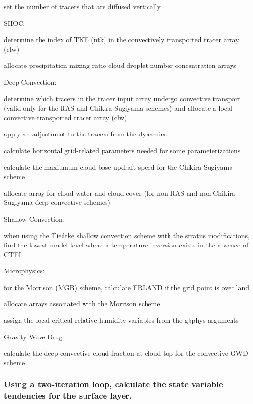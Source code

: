 \begin{DoxyItemize}
\begin{DoxyItemize}
\item set the number of tracers that are diffused vertically
\end{DoxyItemize}
\item S\+H\+OC\+:
\begin{DoxyItemize}
\item determine the index of T\+KE (ntk) in the convectively transported tracer array (clw)
\item allocate precipitation mixing ratio cloud droplet number concentration arrays
\end{DoxyItemize}
\item Deep Convection\+:
\begin{DoxyItemize}
\item determine which tracers in the tracer input array undergo convective transport (valid only for the R\+AS and Chikira-\/\+Sugiyama schemes) and allocate a local convective transported tracer array (clw)
\item apply an adjustment to the tracers from the dynamics
\item calculate horizontal grid-\/related parameters needed for some parameterizations
\item calculate the maxiumum cloud base updraft speed for the Chikira-\/\+Sugiyama scheme
\item allocate array for cloud water and cloud cover (for non-\/\+R\+AS and non-\/\+Chikira-\/\+Sugiyama deep convective schemes)
\end{DoxyItemize}
\item Shallow Convection\+:
\begin{DoxyItemize}
\item when using the Tiedtke shallow convection scheme with the stratus modifications, find the lowest model level where a temperature inversion exists in the absence of C\+T\+EI
\end{DoxyItemize}
\item Microphysics\+:
\begin{DoxyItemize}
\item for the Morrison (M\+GB) scheme, calculate \textquotesingle{}F\+R\+L\+A\+ND\textquotesingle{} if the grid point is over land
\item allocate arrays associated with the Morrison scheme
\item assign the local critical relative humidity variables from the gbphys arguments
\end{DoxyItemize}
\item Gravity Wave Drag\+:
\begin{DoxyItemize}
\item calculate the deep convective cloud fraction at cloud top for the convective G\+WD scheme
\end{DoxyItemize}
\end{DoxyItemize}\subsubsection*{Using a two-\/iteration loop, calculate the state variable tendencies for the surface layer.}


